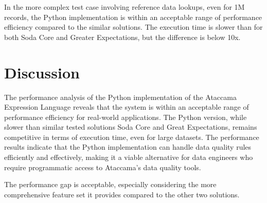 In the more complex test case involving reference data lookups, even for 1M records, the Python implementation is within an acceptable range of performance efficiency compared to the similar solutions. The execution time is slower than for both Soda Core and Greater Expectations, but the difference is below 10x. 

\section{Discussion}


The performance analysis of the Python implementation of the Ataccama Expression Language reveals that the system is within an acceptable range of performance efficiency for real-world applications. The Python version, while slower than similar tested solutions Soda Core and Great Expectations, remains competitive in terms of execution time, even for large datasets. The performance results indicate that the Python implementation can handle data quality rules efficiently and effectively, making it a viable alternative for data engineers who require programmatic access to Ataccama's data quality tools.

The performance gap is acceptable, especially considering the more comprehensive feature set it provides compared to the other two solutions. 




